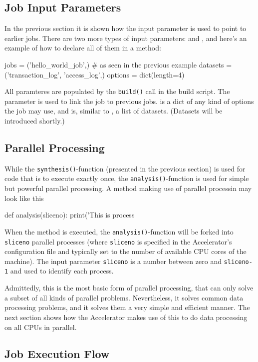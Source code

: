 \subsection{Job Input Parameters}
In the previous section it is shown how the input parameter \jobs is
used to point to earlier jobs.  There are two more types of input
parameters: \options and \datasets, and here's an example of how to
declare all of them in a method:
\begin{python}
jobs = ('hello_world_job',)   # as seen in the previous example
datasets = ('transaction_log', 'access_log',)
options = dict(length=4)
\end{python}
All paramteres are populated by the \texttt{build()} call in the build
script.  The \jobs parameter is used to link the job to previous jobs.
\options is a dict of any kind of options the job may use, and
\datasets is, similar to \jobs, a list of datasets.  (Datasets will be
introduced shortly.)


\subsection{Parallel Processing}

While the \texttt{synthesis()}-function (presented in the previous
section) is used for code that is to execute exactly once, the
\texttt{analysis()}-function is used for simple but powerful parallel
processing.  A method making use of parallel processin may look like
this
\begin{python}
def analysis(sliceno):
    print('This is process %
\end{python}
When the method is executed, the \texttt{analysis()}-function will be
forked into \texttt{sliceno} parallel processes (where
\texttt{sliceno} is specified in the Accelerator's configuration file
and typically set to the number of available CPU cores of the
machine).  The input parameter \texttt{sliceno} is a number between
zero and \texttt{sliceno-1} and used to identify each process.

Admittedly, this is the most basic form of parallel processing, that
can only solve a subset of all kinds of parallel problems.
Nevertheless, it solves common data processing problems, and it solves
them a very simple and efficient manner.  The next section shows how
the Accelerator makes use of this to do data processing on all CPUs in
parallel.


\subsection{Job Execution Flow}

